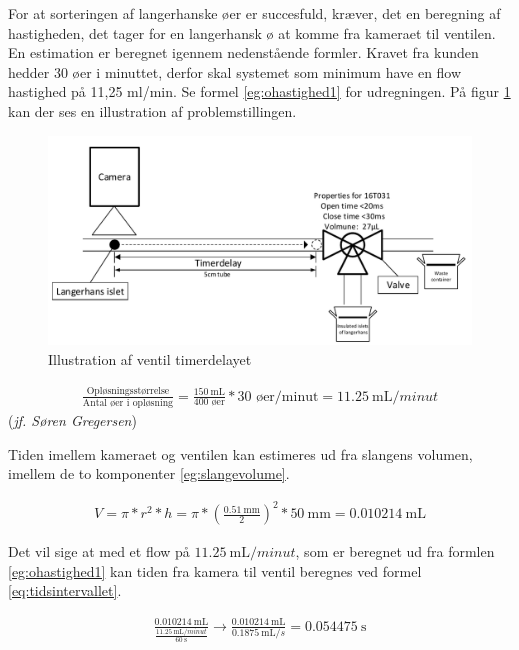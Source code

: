 For at sorteringen af langerhanske øer er succesfuld, kræver, det en beregning af hastigheden, det tager for en langerhansk ø at komme fra kameraet til ventilen. En estimation er beregnet igennem nedenstående formler. Kravet fra kunden hedder 30 øer i minuttet, derfor skal systemet som minimum have en flow hastighed på 11,25 ml/min. Se formel \ref{eg:ohastighed1} for udregningen. På figur \ref{fig:tidsintervalventil} kan der ses en illustration af problemstillingen.

\begin{figure}[H]
	\centering
	\includegraphics[width=1\textwidth]{billeder/tidsinterval.pdf}
	\caption{Illustration af ventil timerdelayet}
	\label{fig:tidsintervalventil}
\end{figure}

\begin{align}
\frac{\text{Opløsningsstørrelse}}{\text{Antal øer i opløsning}} = \frac{\SI{150}{\milli\liter}}{400\text{ øer}}*30\text{ øer/minut} = \SI{11,25}{\milli\liter/minut} 
\label{eg:ohastighed1}
\end{align}(\textit{jf. Søren Gregersen})

Tiden imellem kameraet og ventilen kan estimeres ud fra slangens volumen, imellem de to komponenter \ref{eg:slangevolume}.

\begin{align}
V=\pi*r^2*h=\pi*(\frac{\SI{0,51}{\milli\metre}}{2})^2*\SI{50}{\milli\metre}=\SI{0,010214}{\milli\liter}
\label{eg:slangevolume}
\end{align}

Det vil sige at med et flow på $\SI{11,25}{\milli\liter/minut}$, som er beregnet ud fra formlen \ref{eg:ohastighed1} kan tiden fra kamera til ventil beregnes ved formel \ref{eq:tidsintervallet}. 
 
\begin{align}
\frac{\SI{0,010214}{\milli\liter}}{\frac{\SI{11,25}{\milli\liter/minut}}{\SI{60}{\second}}}\to\frac{\SI{0,010214}{\milli\liter}}{\SI{0,1875}{\milli\liter/s}}=\SI{0.054475}{\second}
\label{eq:tidsintervallet}
\end{align} 

